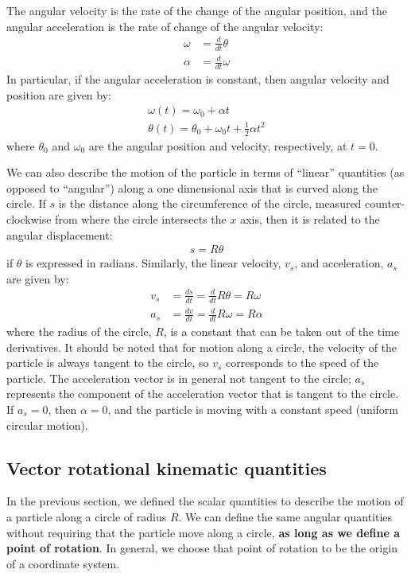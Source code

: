 The angular velocity is the rate of the change of the angular position, and the angular acceleration is the rate of change of the angular velocity:
\begin{align*}
\omega &= \frac{d}{dt}\theta \\
\alpha &= \frac{d}{dt}\omega
\end{align*}
In particular, if the angular acceleration is constant, then angular velocity and position are given by:
\begin{align*}
\omega(t) = \omega_0+\alpha t\\
\theta(t) = \theta_0+\omega_0 t+\frac{1}{2}\alpha t^2
\end{align*}
where $\theta_0$ and $\omega_0$ are the angular position and velocity, respectively, at $t=0$.

We can also describe the motion of the particle in terms of ``linear'' quantities (as opposed to ``angular'') along a one dimensional axis that is curved along the circle. If $s$ is the distance along the circumference of the circle, measured counter-clockwise from where the circle intersects the $x$ axis, then it is related to the angular displacement:
\begin{align*}
s = R\theta
\end{align*}
if $\theta$ is expressed in radians. Similarly, the linear velocity, $v_s$, and acceleration, $a_s$ are given by:
\begin{align*}
v_s &= \frac{ds}{dt} =\frac{d}{dt}R\theta = R\omega\\
a_s&= \frac{dv}{dt} =\frac{d}{dt}R\omega = R\alpha
\end{align*}
where the radius of the circle, $R$, is a constant that can be taken out of the time derivatives. It should be noted that for motion along a circle, the velocity of the particle is always tangent to the circle, so $v_s$ corresponds to the speed of the particle. The acceleration vector is in general not tangent to the circle; $a_s$ represents the component of the acceleration vector that is tangent to the circle. If $a_s=0$, then $\alpha=0$, and the particle is moving with a constant speed (uniform circular motion).




\subsection{Vector rotational kinematic quantities}
In the previous section, we defined the scalar quantities to describe the motion of a particle along a circle of radius $R$. We can define the same angular quantities without requiring that the particle move along a circle, \textbf{as long as we define a point of rotation}. In general, we choose that point of rotation to be the origin of a coordinate system. 

